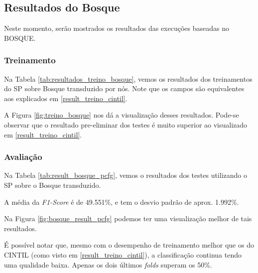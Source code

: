 \subsection{Resultados do Bosque}
\label{subsec:resultados_bosque}
Neste momento, serão mostrados os resultados das execuções baseadas no BOSQUE.

\subsubsection{Treinamento} 
\label{subsubsec:result_treino_bosque}
Na Tabela \ref{tab:resultados_treino_bosque}, vemos os resultados dos treinamentos do SP sobre Bosque transduzido por nós. Note que os campos são equivalentes aos explicados em \ref{result_treino_cintil}.
\begin{center}
    
\end{center}

A Figura \ref{fig:treino_bosque} nos dá a visualização desses resultados. Pode-se observar que o resultado pre-eliminar dos testes é muito superior ao visualizado em \ref{result_treino_cintil}.
\begin{center}
    
\end{center}

\subsubsection{Avaliação} 
\label{subsubsec:result_aval_bosque}
Na Tabela \ref{tab:result_bosque_pcfg}, vemos o resultados dos testes utilizando o SP sobre o Bosque transduzido.
\begin{center}
    
\end{center}

A média da \textit{F1-Score} é de 49.551\%, e tem o desvio padrão de aprox. 1.992\%.

Na Figura \ref{fig:bosque_result_pcfg} podemos ter uma visualização melhor de tais resultados.
\begin{center}
    
\end{center}

É possível notar que, mesmo com o desempenho de treinamento melhor que os do CINTIL (como visto em \ref{result_treino_cintil}), a classificação continua tendo uma qualidade baixa. 
Apenas os dois últimos \textit{folds} superam os 50\%.

